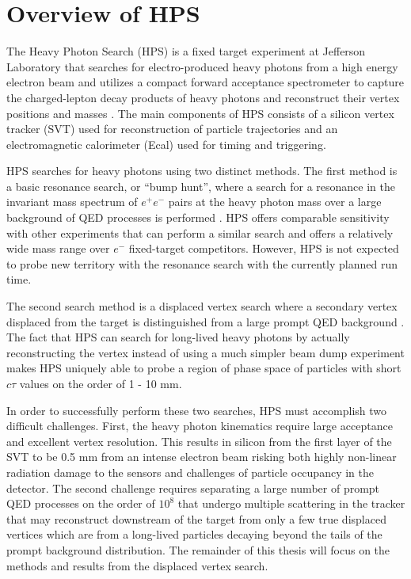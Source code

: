  

\section{Overview of HPS}\label{sec:hps}

The Heavy Photon Search (HPS) is a fixed target experiment at Jefferson Laboratory that searches for electro-produced heavy photons from a high energy electron beam and utilizes a compact forward acceptance spectrometer to capture the charged-lepton decay products of heavy photons and reconstruct their vertex positions and masses \cite{Battaglieri:2014hga}. The main components of HPS consists of a silicon vertex tracker (SVT) used for reconstruction of particle trajectories and an electromagnetic calorimeter (Ecal) used for timing and triggering. 

HPS searches for heavy photons using two distinct methods. The first method is a basic resonance search, or ``bump hunt'', where a search for a resonance in the invariant mass spectrum of $e^+e^-$ pairs at the heavy photon mass over a large background of QED processes is performed \cite{article}. HPS offers comparable sensitivity with other experiments that can perform a similar search and offers a relatively wide mass range over $e^-$ fixed-target competitors. However, HPS is not expected to probe new territory with the resonance search with the currently planned run time.

The second search method is a displaced vertex search where a secondary vertex displaced from the target is distinguished from a large prompt QED background \cite{adrian2018search}. The fact that HPS can search for long-lived heavy photons by actually reconstructing the vertex instead of using a much simpler beam dump experiment makes HPS uniquely able to probe a region of phase space of particles with short $c\tau$ values on the order of 1 - 10 mm.

In order to successfully perform these two searches, HPS must accomplish two difficult challenges. First, the heavy photon kinematics require large acceptance and excellent vertex resolution. This results in silicon from the first layer of the SVT to be 0.5 mm from an intense electron beam risking both highly non-linear radiation damage to the sensors and challenges of particle occupancy in the detector. The second challenge requires separating a large number of prompt QED processes on the order of $10^8$ that undergo multiple scattering in the tracker that may reconstruct downstream of the target from only a few true displaced vertices which are from a long-lived particles decaying beyond the tails of the prompt background distribution. The remainder of this thesis will focus on the methods and results from the displaced vertex search.

